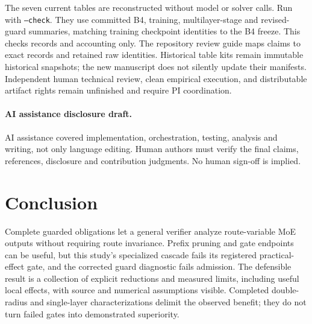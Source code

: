 \documentclass[11pt]{article}
\begin{document}
The seven current tables are reconstructed without model or solver calls.
Run  with \texttt{--check}.
They use committed
B4, training, multilayer-stage and revised-guard summaries, matching training
checkpoint identities to the B4 freeze. This checks records and accounting only.
The repository review guide maps claims to exact records and retained raw
identities. Historical table kits remain immutable historical snapshots; the
new manuscript does not silently update their manifests. Independent human
technical review, clean empirical execution, and distributable artifact rights
remain unfinished and require PI coordination.

\paragraph{AI assistance disclosure draft.}
AI assistance covered implementation, orchestration, testing, analysis and
writing, not only language editing. Human authors must verify the final claims,
references, disclosure and contribution judgments. No human sign-off is implied.

\section{Conclusion}
Complete guarded obligations let a general verifier analyze route-variable MoE
outputs without requiring route invariance. Prefix pruning and gate endpoints
can be useful, but this study's specialized cascade fails its registered
practical-effect gate, and the corrected guard diagnostic fails admission.
The defensible result is a collection of explicit reductions and measured
limits, including useful local effects, with source and numerical assumptions
visible. Completed double-radius and single-layer characterizations delimit
the observed benefit; they do not turn failed gates into demonstrated superiority.
\end{document}

